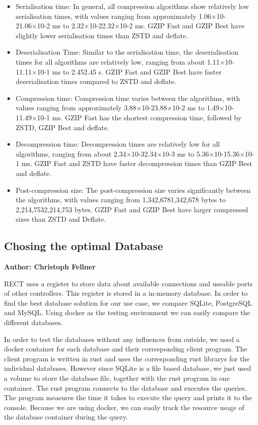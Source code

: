 \begin{itemize}
\item Serialisation time: In general, all compression algorithms show relatively low serialisation times, with values ranging from approximately 1.06×10-21.06×10-2 ms to 2.32×10-22.32×10-2 ms. GZIP Fast and GZIP Best have slightly lower serialisation times than ZSTD and deflate.
\item Deserialisation Time: Similar to the serialisation time, the deserialisation times for all algorithms are relatively low, ranging from about 1.11×10-11.11×10-1 ms to 2.452.45 s. GZIP Fast and GZIP Best have faster deserialisation times compared to ZSTD and deflate.
\item Compression time: Compression time varies between the algorithms, with values ranging from approximately 3.88×10-23.88×10-2 ms to 1.49×10-11.49×10-1 ms. GZIP Fast has the shortest compression time, followed by ZSTD, GZIP Best and deflate.
\item Decompression time: Decompression times are relatively low for all algorithms, ranging from about 2.34×10-32.34×10-3 ms to 5.36×10-15.36×10-1 ms. GZIP Fast and ZSTD have faster decompression times than GZIP Best and deflate.
\item Post-compression size: The post-compression size varies significantly between the algorithms, with values ranging from 1,342,6781,342,678 bytes to 2,214,7532,214,753 bytes. GZIP Fast and GZIP Best have larger compressed sizes than ZSTD and Deflate.
\end{itemize}


\subsection{Chosing the optimal Database}
\textbf{Author: Christoph Fellner}

RECT uses a register to store data about available connections and useable ports of other controllers. This register is stored in a in-memory database. In order to find the 
best database solution for our use case, we compare SQLite, PostgreSQL and MySQL. Using docker as the testing environment we can easily compare the different databases.\newline

In order to test the databases without any influences from outside, we used a docker container for each database and their corresponding client program. The client program
is written in rust and uses the corresponding rust librarys for the individual databases. However since SQLite is a file based database, we just used a volume to store the
database file, together with the rust program in one container. The rust program connects to the database and executes the queries. The program measures the time it 
takes to execute the query and prints it to the console. Because we are using docker, we can easily track the resource usage of the database container during the query.\newline

